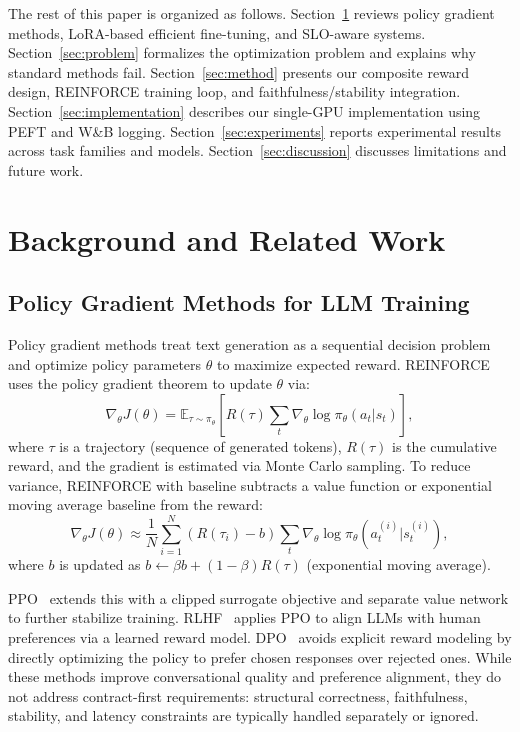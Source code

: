 \documentclass[11pt]{article}
\begin{document}
The rest of this paper is organized as follows.
Section~\ref{sec:background} reviews policy gradient methods, LoRA-based efficient fine-tuning, and SLO-aware systems.
Section~\ref{sec:problem} formalizes the optimization problem and explains why standard methods fail.
Section~\ref{sec:method} presents our composite reward design, REINFORCE training loop, and faithfulness/stability integration.
Section~\ref{sec:implementation} describes our single-GPU implementation using PEFT and W\&B logging.
Section~\ref{sec:experiments} reports experimental results across task families and models.
Section~\ref{sec:discussion} discusses limitations and future work.

\section{Background and Related Work}
\label{sec:background}

\subsection{Policy Gradient Methods for LLM Training}

Policy gradient methods treat text generation as a sequential decision problem and optimize policy parameters $\theta$ to maximize expected reward.
REINFORCE~\citep{williams1992reinforce} uses the policy gradient theorem to update $\theta$ via:
\begin{equation}
\nabla_\theta J(\theta) = \mathbb{E}_{\tau \sim \pi_\theta} \left[ R(\tau) \sum_{t} \nabla_\theta \log \pi_\theta(a_t | s_t) \right],
\end{equation}
where $\tau$ is a trajectory (sequence of generated tokens), $R(\tau)$ is the cumulative reward, and the gradient is estimated via Monte Carlo sampling.
To reduce variance, REINFORCE with baseline subtracts a value function or exponential moving average baseline from the reward:
\begin{equation}
\nabla_\theta J(\theta) \approx \frac{1}{N} \sum_{i=1}^{N} (R(\tau_i) - b) \sum_{t} \nabla_\theta \log \pi_\theta(a_t^{(i)} | s_t^{(i)}),
\end{equation}
where $b$ is updated as $b \leftarrow \beta b + (1-\beta) R(\tau)$ (exponential moving average).

PPO~\citep{schulman2017ppo} extends this with a clipped surrogate objective and separate value network to further stabilize training.
RLHF~\citep{ouyang2022rlhf} applies PPO to align LLMs with human preferences via a learned reward model.
DPO~\citep{rafailov2023dpo} avoids explicit reward modeling by directly optimizing the policy to prefer chosen responses over rejected ones.
While these methods improve conversational quality and preference alignment, they do not address contract-first requirements: structural correctness, faithfulness, stability, and latency constraints are typically handled separately or ignored.
\end{document}
